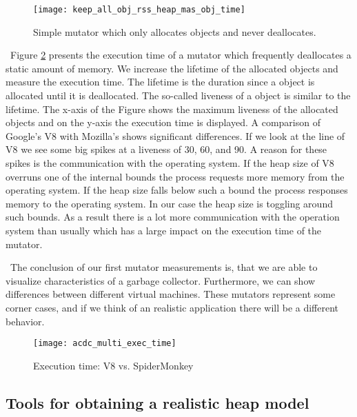 \begin{figure}
	\centering
	\texttt{[image: keep\_all\_obj\_rss\_heap\_mas\_obj\_time]}
	\caption{Simple mutator which only allocates objects and never deallocates.}
	\label{fig:mutator_keep_all_obj}
\end{figure}

\
Figure \ref{fig:acdc_multi_exec_time} presents the execution time of a mutator which frequently deallocates a static amount of memory. We increase the lifetime of the allocated objects and measure the execution time. The lifetime is the duration since a object is allocated until it is deallocated. The so-called liveness of a object is similar to the lifetime. The x-axis of the Figure shows the maximum liveness of the allocated objects and on the y-axis the execution time is displayed. A comparison of Google's V8 with Mozilla's \SM shows significant differences. If we look at the line of V8 we see some big spikes at a liveness of 30, 60, and 90. A reason for these spikes is the communication with the operating system. If the heap size of V8 overruns one of the internal bounds the process requests more memory from the operating system. If the heap size falls below such a bound the process responses memory to the operating system. In our case the heap size is toggling around such bounds. As a result there is a lot more communication with the operation system than usually which has a large impact on the execution time of the mutator.

\
The conclusion of our first mutator measurements is, that we are able to visualize characteristics of a garbage collector. Furthermore, we can show differences between different virtual machines. These mutators represent some corner cases, and if we think of an realistic \JS application there will be a different behavior.

\begin{figure}
	\centering
	\texttt{[image: acdc\_multi\_exec\_time]}
	\caption{Execution time: V8 vs. SpiderMonkey}
	\label{fig:acdc_multi_exec_time}
\end{figure}



\subsection{Tools for obtaining a realistic heap model}

